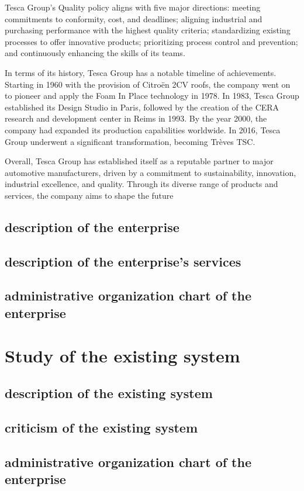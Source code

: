 Tesca Group's Quality policy aligns with five major directions: meeting commitments to conformity, cost, and deadlines; aligning industrial and purchasing performance with the highest quality criteria; standardizing existing processes to offer innovative products; prioritizing process control and prevention; and continuously enhancing the skills of its teams.

In terms of its history, Tesca Group has a notable timeline of achievements. Starting in 1960 with the provision of Citroën 2CV roofs, the company went on to pioneer and apply the Foam In Place technology in 1978. In 1983, Tesca Group established its Design Studio in Paris, followed by the creation of the CERA research and development center in Reims in 1993. By the year 2000, the company had expanded its production capabilities worldwide. In 2016, Tesca Group underwent a significant transformation, becoming Trèves TSC.

Overall, Tesca Group has established itself as a reputable partner to major automotive manufacturers, driven by a commitment to sustainability, innovation, industrial excellence, and quality. Through its diverse range of products and services, the company aims to shape the future
\subsection{description of the  enterprise }
\subsection{description of the  enterprise's services}
\subsection{administrative organization chart of the enterprise}
\vspace{1em}
\section{Study of the existing system}
\subsection{description of the existing system }
\subsection{criticism of the existing system}
\subsection{administrative organization chart of the enterprise}
\vspace{1em}
